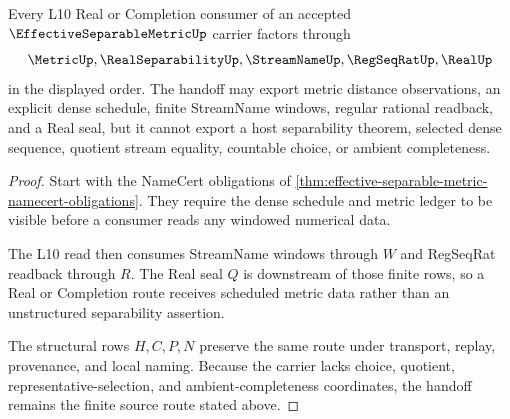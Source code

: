 \begin{theorem}
\label{thm:effective-separable-metric-l10-source-handoff}
Every L10 Real or Completion consumer of an accepted $\EffectiveSeparableMetricUp$ carrier factors through
$$
\MetricUp,\RealSeparabilityUp,\StreamNameUp,\RegSeqRatUp,\RealUp
$$
in the displayed order. The handoff may export metric distance observations, an explicit dense schedule, finite StreamName windows, regular rational readback, and a Real seal, but it cannot export a host separability theorem, selected dense sequence, quotient stream equality, countable choice, or ambient completeness.
\end{theorem}
\begin{proof}
Start with the NameCert obligations of \autoref{thm:effective-separable-metric-namecert-obligations}. They require the dense schedule and metric ledger to be visible before a consumer reads any windowed numerical data.

The L10 read then consumes StreamName windows through $W$ and RegSeqRat readback through $R$. The Real seal $Q$ is downstream of those finite rows, so a Real or Completion route receives scheduled metric data rather than an unstructured separability assertion.

The structural rows $H,C,P,N$ preserve the same route under transport, replay, provenance, and local naming. Because the carrier lacks choice, quotient, representative-selection, and ambient-completeness coordinates, the handoff remains the finite source route stated above.
\end{proof}




